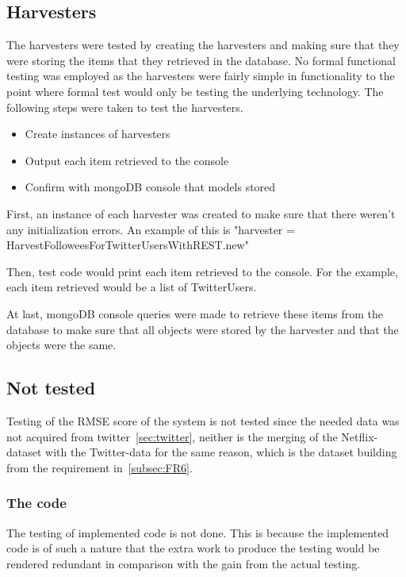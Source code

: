 \subsection{Harvesters}
The harvesters were tested by creating the harvesters and making sure that they were storing the items that they retrieved in the database. No formal functional testing was employed as the harvesters were fairly simple in functionality to the point where formal test would only be testing the underlying technology. The following steps were taken to test the harvesters.

	\begin{itemize}
	\item Create instances of harvesters
	\item Output each item retrieved to the console
	\item Confirm with mongoDB console that models stored
	\end{itemize}

First, an instance of each harvester was created to make sure that there weren't any initialization errors. An example of this is "harvester = HarvestFolloweesForTwitterUsersWithREST.new"

Then, test code would print each item retrieved to the console. For the example, each item retrieved would be a list of TwitterUsers.

At last, mongoDB console queries were made to retrieve these items from the database to make sure that all objects were stored by the harvester and that the objects were the same.

\subsection{Not tested}
Testing of the RMSE score of the system is not tested since the needed data was not acquired from twitter~\ref{sec:twitter}, neither is the merging of the Netflix-dataset with the Twitter-data for the same reason, which is the dataset building from the requirement in~\ref{subsec:FR6}.

\subsubsection{The code}
The testing of implemented code is not done. This is because the implemented code is of such a nature that the extra work to produce the testing would be rendered redundant in comparison with the gain from the actual testing.
